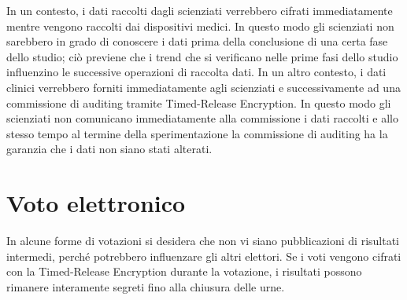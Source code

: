In un contesto, i dati raccolti dagli scienziati verrebbero cifrati
immediatamente mentre vengono raccolti dai dispositivi medici. In questo modo gli scienziati
non sarebbero in grado di conoscere i dati prima della conclusione di una certa fase dello studio;
ciò previene che i trend che si verificano nelle prime fasi dello studio influenzino
le successive operazioni di raccolta dati.
In un altro contesto, i dati clinici verrebbero forniti immediatamente agli scienziati
e successivamente ad una commissione di auditing tramite Timed-Release Encryption.
In questo modo gli scienziati non comunicano immediatamente alla commissione i dati raccolti
e allo stesso tempo al termine della sperimentazione
la commissione di auditing ha la garanzia che i dati non siano stati alterati.

\section{Voto elettronico}
In alcune forme di votazioni si desidera che non vi siano pubblicazioni di risultati intermedi,
perché potrebbero influenzare gli altri elettori. Se i voti vengono cifrati con
la Timed-Release Encryption durante la votazione, i risultati possono rimanere interamente segreti
fino alla chiusura delle urne.





